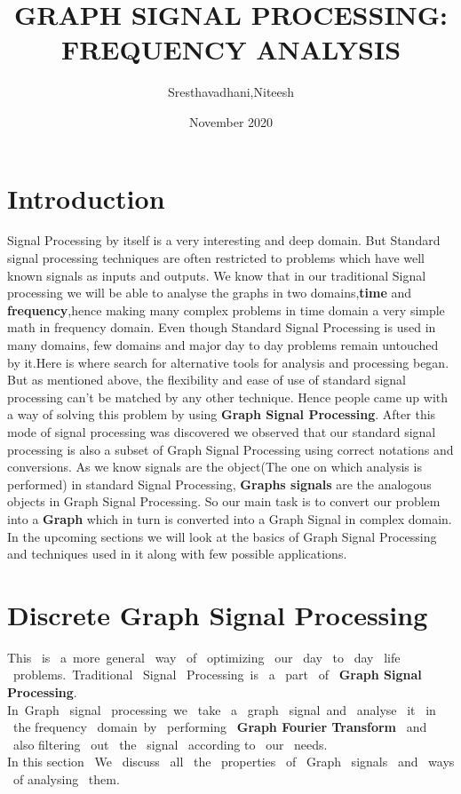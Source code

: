 \documentclass[12pt,onecolumn]{article}
\begin{document}
\title{GRAPH SIGNAL PROCESSING:
FREQUENCY ANALYSIS}
\author{Sresthavadhani,Niteesh}
\date{November 2020}
\maketitle

\section{\textbf{Introduction}}
Signal Processing by itself is a very interesting and deep domain. But Standard signal processing techniques are often restricted to problems which have well known signals as inputs and outputs. We know that in our traditional Signal processing we will be able to analyse the graphs in two domains,\textbf{time} and \textbf{frequency},hence making many complex problems in time domain a very simple math in frequency domain.
\newline
\newline
Even though Standard Signal Processing is used in many domains, few domains and major day to day problems remain untouched by it.Here is where search for alternative tools for analysis and processing began. But as mentioned above, the flexibility and ease of use of standard signal processing can't be matched by any other technique. Hence people came up with a way of solving this problem by using \textbf{Graph Signal Processing}. After this mode of signal processing was discovered we observed that our standard signal processing is also a subset of Graph Signal Processing using correct notations and conversions.
\newline
\newline
As we know signals are the object(The one on which analysis is performed) in standard Signal Processing, \textbf{Graphs signals} are the analogous objects in Graph Signal Processing. So our main task is to convert our problem into a \textbf{Graph} which in turn is converted into a Graph Signal in complex domain.
\newline
\newline
In the upcoming sections we will look at the basics of Graph Signal \newline Processing and techniques used in it along with few possible applications.


\section{\textbf{Discrete Graph Signal Processing}}
This \ is \ a\ more\ general \ way \ of \ optimizing \ our \ day \ to \ day \ life \ problems.\ Traditional \ Signal \ Processing\ is \  a \ part \ of \ \textbf{Graph Signal Processing}. \\
In\  Graph \ signal \ processing\ we \ take \ a \ graph \ signal\ and \ analyse \ it \ in \ the frequency \ domain\ by \ performing \ \textbf{Graph Fourier Transform} \ and \ also filtering \ out \ the \ signal \ according to \ our \ needs. \\
In this section \ We \ discuss \ all \ the \ properties \ of \ Graph \ signals \ and \ ways \ of analysing \ them. \\ 
\end{document}
